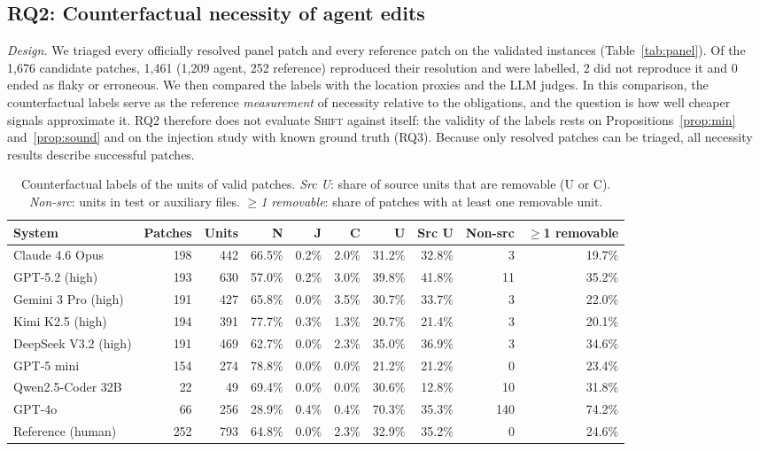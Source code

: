 \documentclass[a4paper,fleqn]{cas-sc}
\newcommand{\tool}{\textsc{Shift}}
\newcommand{\lab}[1]{\textsf{#1}}
\newcommand{\nAgentValid}{1{,}209}
\newcommand{\nCandidates}{1{,}676}
\newcommand{\nGoldValid}{252}
\newcommand{\nNotValid}{2}
\newcommand{\nOtherStatus}{0}
\newcommand{\nValidPatches}{1{,}461}
\begin{document}
\subsection{RQ2: Counterfactual necessity of agent edits}\label{sec:rq2}
\emph{Design.} We triaged every officially resolved panel patch and every reference patch on the validated instances (Table~\ref{tab:panel}). Of the \nCandidates{} candidate patches, \nValidPatches{} (\nAgentValid{} agent, \nGoldValid{} reference) reproduced their resolution and were labelled, \nNotValid{} did not reproduce it and \nOtherStatus{} ended as flaky or erroneous. We then compared the labels with the location proxies and the LLM judges. In this comparison, the counterfactual labels serve as the reference \emph{measurement} of necessity relative to the obligations, and the question is how well cheaper signals approximate it. RQ2 therefore does not evaluate \tool{} against itself: the validity of the labels rests on Propositions~\ref{prop:min} and~\ref{prop:sound} and on the injection study with known ground truth (RQ3). Because only resolved patches can be triaged, all necessity results describe successful patches.

\begin{table}[t]
\caption{Counterfactual labels of the units of valid patches. \emph{Src U}: share of source units that are removable (\lab{U} or \lab{C}). \emph{Non-src}: units in test or auxiliary files. \emph{$\geq$1 removable}: share of patches with at least one removable unit.}
\label{tab:labels}
\centering\footnotesize
\begin{tabular}{lrrrrrrrrr}
\toprule
System & Patches & Units & \lab{N} & \lab{J} & \lab{C} & \lab{U} & Src U & Non-src & $\geq$1 removable \\
\midrule
Claude 4.6 Opus & 198 & 442 & 66.5\% & 0.2\% & 2.0\% & 31.2\% & 32.8\% & 3 & 19.7\% \\
GPT-5.2 (high) & 193 & 630 & 57.0\% & 0.2\% & 3.0\% & 39.8\% & 41.8\% & 11 & 35.2\% \\
Gemini 3 Pro (high) & 191 & 427 & 65.8\% & 0.0\% & 3.5\% & 30.7\% & 33.7\% & 3 & 22.0\% \\
Kimi K2.5 (high) & 194 & 391 & 77.7\% & 0.3\% & 1.3\% & 20.7\% & 21.4\% & 3 & 20.1\% \\
DeepSeek V3.2 (high) & 191 & 469 & 62.7\% & 0.0\% & 2.3\% & 35.0\% & 36.9\% & 3 & 34.6\% \\
GPT-5 mini & 154 & 274 & 78.8\% & 0.0\% & 0.0\% & 21.2\% & 21.2\% & 0 & 23.4\% \\
Qwen2.5-Coder 32B & 22 & 49 & 69.4\% & 0.0\% & 0.0\% & 30.6\% & 12.8\% & 10 & 31.8\% \\
GPT-4o & 66 & 256 & 28.9\% & 0.4\% & 0.4\% & 70.3\% & 35.3\% & 140 & 74.2\% \\
Reference (human) & 252 & 793 & 64.8\% & 0.0\% & 2.3\% & 32.9\% & 35.2\% & 0 & 24.6\% \\
\bottomrule
\end{tabular}
\end{table}
\end{document}
